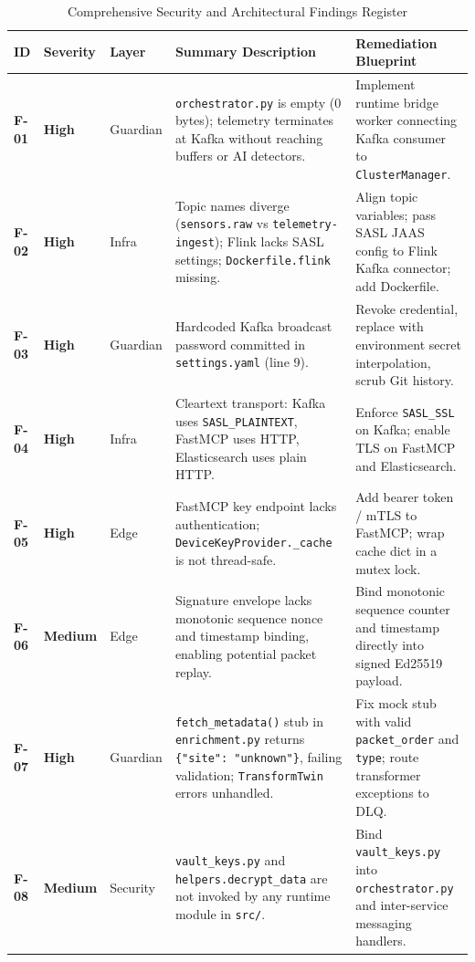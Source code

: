 \documentclass[10pt,a4paper]{report}
\begin{document}
\begin{table}[htbp]
\centering
\scriptsize
\caption{Comprehensive Security and Architectural Findings Register}
\label{tab:findings_register}
\begin{tabularx}{\textwidth}{llp{1.8cm}Xp{3.5cm}}
\toprule
\textbf{ID} & \textbf{Severity} & \textbf{Layer} & \textbf{Summary Description} & \textbf{Remediation Blueprint} \\
\midrule
\textbf{F-01} & \textbf{High} & Guardian & \texttt{orchestrator.py} is empty (0 bytes); telemetry terminates at Kafka without reaching buffers or AI detectors. & Implement runtime bridge worker connecting Kafka consumer to \texttt{ClusterManager}. \\
\textbf{F-02} & \textbf{High} & Infra & Topic names diverge (\texttt{sensors.raw} vs \texttt{telemetry-ingest}); Flink lacks SASL settings; \texttt{Dockerfile.flink} missing. & Align topic variables; pass SASL JAAS config to Flink Kafka connector; add Dockerfile. \\
\textbf{F-03} & \textbf{High} & Guardian & Hardcoded Kafka broadcast password committed in \texttt{settings.yaml} (line 9). & Revoke credential, replace with environment secret interpolation, scrub Git history. \\
\textbf{F-04} & \textbf{High} & Infra & Cleartext transport: Kafka uses \texttt{SASL\_PLAINTEXT}, FastMCP uses HTTP, Elasticsearch uses plain HTTP. & Enforce \texttt{SASL\_SSL} on Kafka; enable TLS on FastMCP and Elasticsearch. \\
\textbf{F-05} & \textbf{High} & Edge & FastMCP key endpoint lacks authentication; \lstinline{DeviceKeyProvider._cache} is not thread-safe. & Add bearer token / mTLS to FastMCP; wrap cache dict in a mutex lock. \\
\textbf{F-06} & \textbf{Medium} & Edge & Signature envelope lacks monotonic sequence nonce and timestamp binding, enabling potential packet replay. & Bind monotonic sequence counter and timestamp directly into signed Ed25519 payload. \\
\textbf{F-07} & \textbf{High} & Guardian & \lstinline|fetch_metadata()| stub in \texttt{enrichment.py} returns \lstinline|{"site": "unknown"}|, failing validation; \texttt{TransformTwin} errors unhandled. & Fix mock stub with valid \texttt{packet\_order} and \texttt{type}; route transformer exceptions to DLQ. \\
\textbf{F-08} & \textbf{Medium} & Security & \texttt{vault\_keys.py} and \lstinline{helpers.decrypt_data} are not invoked by any runtime module in \texttt{src/}. & Bind \texttt{vault\_keys.py} into \texttt{orchestrator.py} and inter-service messaging handlers. \\

\end{tabularx}
\end{table}
\end{document}
